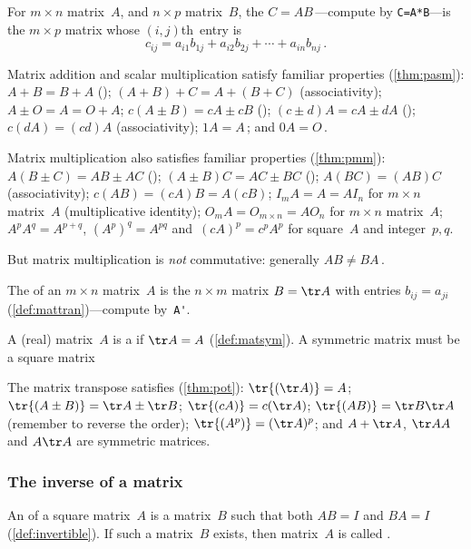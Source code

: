 \begin{itemize}
\begin{itemize}
\itemhi For \(m\times n\) matrix~\(A\), and \(n\times p\) matrix~\(B\), the  \(C=AB\)\,---compute by \verb|C=A*B|---is the \(m\times p\) matrix whose \((i,j)\)th~entry is
\begin{equation*}
c_{ij}=a_{i1}b_{1j}+a_{i2}b_{2j}+\cdots+a_{in}b_{nj}\,.
\end{equation*}

\end{itemize}

\itemme Matrix addition and scalar multiplication satisfy familiar properties (\autoref{thm:pasm}): 
 \(A+B=B+A\) ();
 \((A+B)+C=A+(B+C)\) (associativity);
 \(A\pm O=A=O+A\);
 \(c(A\pm B)=cA\pm cB\) ();
 \((c\pm d)A=cA\pm dA\) ();
 \(c(dA)=(cd)A\) (associativity);
 \(1A=A\)\,; and 
 \(0A=O\)\,.
 
\itemme Matrix multiplication also satisfies familiar properties (\autoref{thm:pmm}):
 \(A(B\pm C)=AB\pm AC\) ();
 \((A\pm B)C=AC\pm BC\) ();
 \(A(BC)=(AB)C\) (associativity);
 \(c(AB)=(cA)B=A(cB)\);
 \(I_mA=A=AI_n\) for \(m\times n\) matrix~\(A\) (multiplicative identity);
 \(O_mA=O_{m\times n}=AO_n\)  for \(m\times n\) matrix~\(A\);
 \(A^pA^q=A^{p+q}\), \((A^p)^q=A^{pq}\) and~\((cA)^p=c^pA^p\) for square~\(A\) and integer~\(p,q\).
 
But matrix multiplication is \emph{not} commutative: generally \(AB\neq BA\)\,.

\itemhi The  of an \(m\times n\) matrix~\(A\) is the \(n\times m\) matrix \(B=\tr A\) with entries \(b_{ij}=a_{ji}\) (\autoref{def:mattran})---compute by~\verb|A'|.

A (real) matrix~\(A\) is a  if \(\tr A=A\) (\autoref{def:matsym}).
A symmetric matrix must be a square matrix

\itemme The matrix transpose satisfies (\autoref{thm:pot}):
\(\tr{(\tr A)}=A\);
\(\tr{(A\pm B)}=\tr A\pm \tr B\);
\(\tr{(cA)}=c(\tr A)\);
\(\tr{(AB)}=\tr B\tr A\) (remember to reverse the order);
\(\tr{(A^p)}=(\tr A)^p\);
and \(A+\tr A\),  \(\tr AA\) and \(A\tr A\) are symmetric matrices.





\subsubsection{The inverse of a matrix}

\itemhi An  of a square matrix~\(A\) is a matrix~\(B\) such that both \(AB=I\) and \(BA=I\) (\autoref{def:invertible}).
If such a matrix~\(B\) exists, then matrix~\(A\) is called .


\end{itemize}
